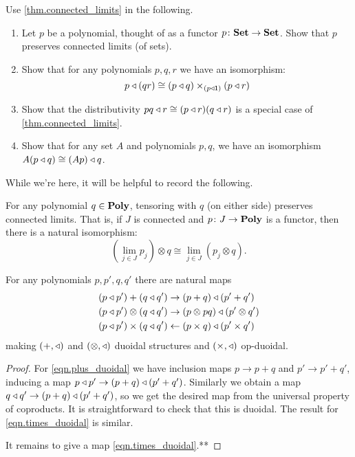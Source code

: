 \documentclass[Book-Poly]{subfiles}
\begin{document}
\begin{exercise}\label{ex.connected_limits_and_tri}
Use \cref{thm.connected_limits} in the following.
\begin{enumerate}
	\item Let $p$ be a polynomial, thought of as a functor $p\colon\mathbf{Set}\to\mathbf{Set}$. Show that $p$ preserves connected limits (of sets).
	\item Show that for any polynomials $p,q,r$ we have an isomorphism:
	\[
	p\mathbin{\triangleleft}(qr)\cong (p\mathbin{\triangleleft} q)\times_{(p\mathbin{\triangleleft}\textsf{1})}(p\mathbin{\triangleleft} r)
	\]
	\item Show that the distributivity $pq\mathbin{\triangleleft} r\cong (p\mathbin{\triangleleft} r)(q\mathbin{\triangleleft} r)$ is a special case of \cref{thm.connected_limits}.
	\item Show that for any set $A$ and polynomials $p,q$, we have an isomorphism $A(p\mathbin{\triangleleft} q)\cong (Ap)\mathbin{\triangleleft} q$.
\qedhere
\end{enumerate}
\end{exercise}

While we're here, it will be helpful to record the following.
\begin{proposition}
For any polynomial $q\in\mathbf{Poly}$, tensoring with $q$ (on either side) preserves connected limits. That is, if $J$ is connected and $p\colon J\to\mathbf{Poly}$ is a functor, then there is a natural isomorphism:
\[
	\left(\lim_{j\in J} p_j\right)\otimes q\cong
	\lim_{j\in J} (p_j\otimes q).
\]
\end{proposition}


\begin{proposition}
For any polynomials $p,p',q,q'$ there are natural maps
\begin{align}\label{eqn.plus_duoidal}
	(p\mathbin{\triangleleft} p')+(q\mathbin{\triangleleft} q')&\to (p+q)\mathbin{\triangleleft}(p'+q')\\\label{eqn.otimes_duoidal}
	(p\mathbin{\triangleleft} p')\otimes(q\mathbin{\triangleleft} q')&\to(p\otimes pq)\mathbin{\triangleleft}(p'\otimes q')\\\label{eqn.times_duoidal}
	(p\mathbin{\triangleleft} p')\times (q\mathbin{\triangleleft} q')&\leftarrow(p\times q)\mathbin{\triangleleft}(p'\times q')
\end{align}
making $(+,\mathbin{\triangleleft})$ and $(\otimes,\mathbin{\triangleleft})$ duoidal structures and $(\times,\mathbin{\triangleleft})$ op-duoidal.
\end{proposition}
\begin{proof}
For \eqref{eqn.plus_duoidal} we have inclusion maps $p\to p+q$ and $p'\to p'+q'$, inducing a map $p\mathbin{\triangleleft} p'\to(p+q)\mathbin{\triangleleft}(p'+q')$. Similarly we obtain a map $q\mathbin{\triangleleft} q'\to(p+q)\mathbin{\triangleleft}(p'+q')$, so we get the desired map from the universal property of coproducts. It is straightforward to check that this is duoidal. The result for \eqref{eqn.times_duoidal} is similar. 

It remains to give a map \eqref{eqn.times_duoidal}.**
\end{proof}
\end{document}
